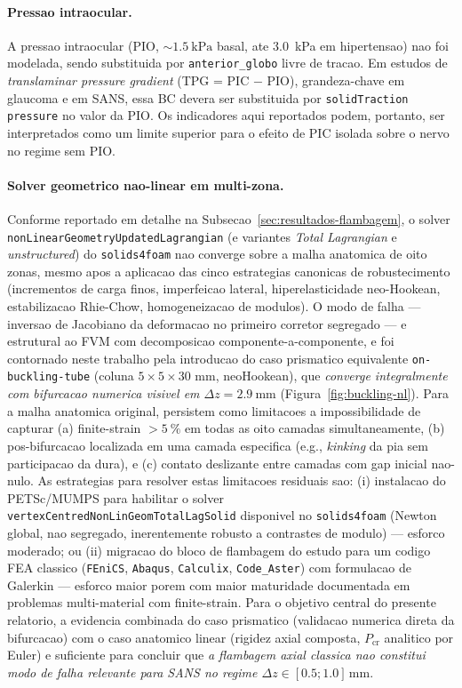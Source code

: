 \paragraph{Pressao intraocular.} A pressao intraocular (PIO, $\sim \SI{1.5}{\kilo\pascal}$ basal, ate \SI{3.0}{\kilo\pascal} em hipertensao) nao foi modelada, sendo substituida por \texttt{anterior\_globo} livre de tracao. Em estudos de \emph{translaminar pressure gradient} (TPG = PIC $-$ PIO), grandeza-chave em glaucoma e em SANS, essa BC devera ser substituida por \texttt{solidTraction pressure} no valor da PIO. Os indicadores aqui reportados podem, portanto, ser interpretados como um limite superior para o efeito de PIC isolada sobre o nervo no regime sem PIO.

\paragraph{Solver geometrico nao-linear em multi-zona.} Conforme reportado em detalhe na Subsecao~\ref{sec:resultados-flambagem}, o solver \texttt{nonLinearGeometryUpdatedLagrangian} (e variantes \emph{Total Lagrangian} e \emph{unstructured}) do \texttt{solids4foam} nao converge sobre a malha anatomica de oito zonas, mesmo apos a aplicacao das cinco estrategias canonicas de robustecimento (incrementos de carga finos, imperfeicao lateral, hiperelasticidade neo-Hookean, estabilizacao Rhie-Chow, homogeneizacao de modulos). O modo de falha --- inversao de Jacobiano da deformacao no primeiro corretor segregado --- e estrutural ao FVM com decomposicao componente-a-componente, e foi contornado neste trabalho pela introducao do caso prismatico equivalente \texttt{on-buckling-tube} (coluna $5 \times 5 \times 30$ mm, neoHookean), que \emph{converge integralmente com bifurcacao numerica visivel em $\Delta z = \SI{2.9}{\milli\meter}$} (Figura~\ref{fig:buckling-nl}). Para a malha anatomica original, persistem como limitacoes a impossibilidade de capturar (a) finite-strain $> \SI{5}{\percent}$ em todas as oito camadas simultaneamente, (b) pos-bifurcacao localizada em uma camada especifica (e.g., \emph{kinking} da pia sem participacao da dura), e (c) contato deslizante entre camadas com gap inicial nao-nulo. As estrategias para resolver estas limitacoes residuais sao: (i) instalacao do PETSc/MUMPS para habilitar o solver \texttt{vertexCentredNonLinGeomTotalLagSolid} disponivel no \texttt{solids4foam} (Newton global, nao segregado, inerentemente robusto a contrastes de modulo) --- esforco moderado; ou (ii) migracao do bloco de flambagem do estudo para um codigo FEA classico (\texttt{FEniCS}, \texttt{Abaqus}, \texttt{Calculix}, \texttt{Code\_Aster}) com formulacao de Galerkin --- esforco maior porem com maior maturidade documentada em problemas multi-material com finite-strain. Para o objetivo central do presente relatorio, a evidencia combinada do caso prismatico (validacao numerica direta da bifurcacao) com o caso anatomico linear (rigidez axial composta, $P_{\mathrm{cr}}$ analitico por Euler) e suficiente para concluir que \emph{a flambagem axial classica nao constitui modo de falha relevante para SANS no regime $\Delta z \in [0.5; 1.0]\,\si{\milli\meter}$}.
